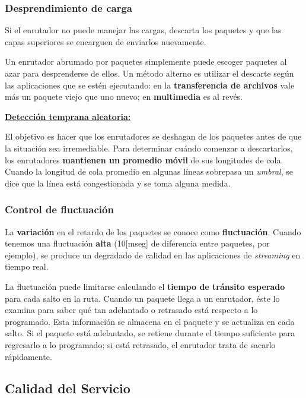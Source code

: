 \documentclass[10pt,a4paper]{article}
\begin{document}
\subsubsection{Desprendimiento de carga}

Si el enrutador no puede manejar las cargas, descarta los paquetes y que las
capas superiores se encarguen de enviarlos nuevamente.

Un enrutador abrumado por paquetes simplemente puede escoger paquetes al azar para desprenderse de ellos. Un método alterno es utilizar el descarte según las aplicaciones que se estén ejecutando: en la \textbf{transferencia de archivos} vale más un
paquete viejo que uno nuevo; en \textbf{multimedia} es al revés.

\underline{\textbf{Detección temprana aleatoria:}}

El objetivo es hacer que los enrutadores se deshagan de los paquetes antes de que la situación sea irremediable. Para determinar cuándo comenzar a descartarlos, los enrutadores \textbf{mantienen un promedio móvil} de sus longitudes de cola. Cuando la longitud de cola promedio en algunas líneas sobrepasa un \textit{umbral}, se dice que la línea está congestionada y se toma alguna medida.

\subsubsection{Control de fluctuación}

La \textbf{variación} en el retardo de los paquetes se conoce como \textbf{fluctuación}. Cuando tenemos una fluctuación \textbf{alta} (10[mseg] de diferencia entre paquetes, por ejemplo), se produce un degradado de calidad en las aplicaciones de \textit{streaming} en tiempo real.

La fluctuación puede limitarse calculando el \textbf{tiempo de tránsito esperado} para cada salto en la ruta. Cuando un paquete llega a un enrutador, éste lo examina para saber qué tan adelantado o retrasado está respecto a lo programado. Esta información se almacena en el paquete y se actualiza en cada salto. Si el paquete está adelantado, se retiene durante el tiempo suficiente para regresarlo a lo programado; si está retrasado, el enrutador trata de sacarlo rápidamente.

\subsection{Calidad del Servicio}
\end{document}
